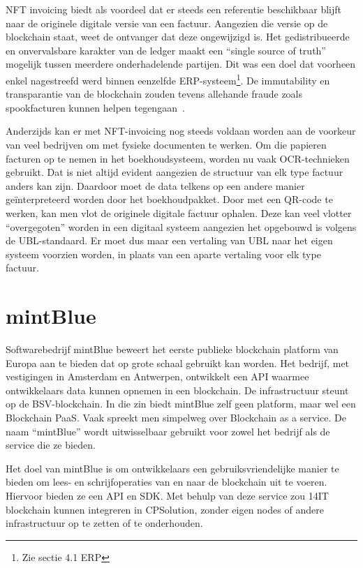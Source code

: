 NFT invoicing biedt als voordeel dat er steeds een referentie beschikbaar blijft naar de originele digitale versie van een factuur. Aangezien die versie op de blockchain staat, weet de ontvanger dat deze ongewijzigd is. Het gedistribueerde en onvervalsbare karakter van de ledger maakt een ``single source of truth'' mogelijk tussen meerdere onderhadelende partijen. Dit was een doel dat voorheen enkel nagestreefd werd binnen eenzelfde ERP-systeem\footnote{Zie sectie 4.1 ERP}. De immutability en transparantie van de blockchain zouden tevens allehande fraude zoals spookfacturen kunnen helpen tegengaan~\cite{Sterk2021}. 

Anderzijds kan er met NFT-invoicing nog steeds voldaan worden aan de voorkeur van veel bedrijven om met fysieke documenten te werken. Om die papieren facturen op te nemen in het boekhoudsysteem, worden nu vaak OCR-technieken gebruikt. Dat is niet altijd evident aangezien de structuur van elk type factuur anders kan zijn. Daardoor moet de data telkens op een andere manier geïnterpreteerd worden door het boekhoudpakket. Door met een QR-code te werken, kan men vlot de originele digitale factuur ophalen. Deze kan veel vlotter ``overgegoten'' worden in een digitaal systeem aangezien het opgebouwd is volgens de UBL-standaard. Er moet dus maar een vertaling van UBL naar het eigen systeem voorzien worden, in plaats van een aparte vertaling voor elk type factuur.

\section{mintBlue}
\label{sec:mintBlue}

Softwarebedrijf mintBlue beweert het eerste publieke blockchain platform van Europa aan te bieden dat op grote schaal gebruikt kan worden. Het bedrijf, met vestigingen in Amsterdam en Antwerpen, ontwikkelt een API waarmee ontwikkelaars data kunnen opnemen in een blockchain. De infrastructuur steunt op de BSV-blockchain. In die zin biedt mintBlue zelf geen platform, maar wel een Blockchain PaaS. Vaak spreekt men simpelweg over Blockchain as a service. De naam ``mintBlue'' wordt uitwisselbaar gebruikt voor zowel het bedrijf als de service die ze bieden.

Het doel van mintBlue is om ontwikkelaars een gebruiksvriendelijke manier te bieden om lees- en schrijfoperaties van en naar de blockchain uit te voeren. Hiervoor bieden ze een API en SDK. Met behulp van deze service zou 14IT blockchain kunnen integreren in CPSolution, zonder eigen nodes of andere infrastructuur op te zetten of te onderhouden.

